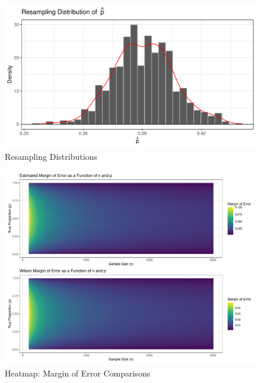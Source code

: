 \documentclass{article}\usepackage[]{graphicx}\usepackage[]{xcolor}
\makeatletter
\def\maxwidth{ %
  \ifdim\Gin@nat@width>\linewidth
    \linewidth
  \else
    \Gin@nat@width
  \fi
}
\newenvironment{knitrout}{}{} %
\makeatother
\begin{document}
\begin{figure}[H]
\begin{center}
\begin{knitrout}
\color{fgcolor}

{\centering \includegraphics[width=\maxwidth]{figure/unnamed-chunk-5-1} 

}


\end{knitrout}
\caption{Resampling Distributions}
\label{plot2} 
\end{center}
\end{figure}



\begin{figure}[H]
\begin{center}
\begin{knitrout}
\color{fgcolor}

{\centering \includegraphics[width=\maxwidth]{figure/unnamed-chunk-6-1} 

}


\end{knitrout}
\caption{Heatmap: Margin of Error Comparisons}
\label{plot3} 
\end{center}
\end{figure}
\end{document}

